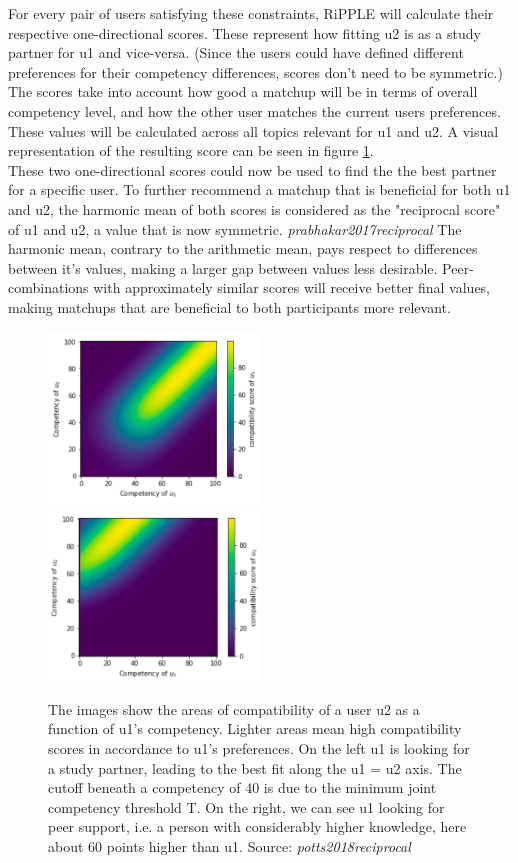 \documentclass[nochapterpage,bigchapter,linedtoc,longdoc,colorback,accentcolor=tud3b,oneside]{tudreport}
\begin{document}
For every pair of users satisfying these constraints, RiPPLE will calculate their respective one-directional scores. These represent how fitting u2 is as a study partner for u1 and vice-versa. (Since the users could have defined different preferences for their competency differences, scores don't need to be symmetric.) The scores take into account how good a matchup will be in terms of overall competency level, and how the other user matches the current users preferences. These values will be calculated across all topics relevant for u1 and u2. A visual representation of the resulting score can be seen in figure \ref{f:Seeking}.\\
These two one-directional scores could now be used to find the the best partner for a specific user. To further recommend a matchup that is beneficial for both u1 and u2, the harmonic mean of both scores is considered as the "reciprocal score" of u1 and u2, a value that is now symmetric. \textit{prabhakar2017reciprocal} The harmonic mean, contrary to the arithmetic mean, pays respect to differences between it's values, making a larger gap between values less desirable. Peer-combinations with approximately similar scores will receive better final values, making matchups that are beneficial to both participants more relevant.\\
\begin{figure}[h]
	\includegraphics[width=0.5\textwidth]{g/SeekingPartnerCompatibility.PNG}
	\includegraphics[width=0.5\textwidth]{g/SeekingSupportCompatibility.PNG}
	\caption{The images show the areas of compatibility of a user u2 as a function of u1's competency. Lighter areas mean high compatibility scores in accordance to u1's preferences. On the left u1 is looking for a study partner, leading to the best fit along the u1 = u2 axis. The cutoff beneath a competency of 40 is due to the minimum joint competency threshold T. On the right, we can see u1 looking for peer support, i.e. a person with considerably higher knowledge, here about 60 points higher than u1. Source: \textit{potts2018reciprocal}}
	\label{f:Seeking}
\end{figure}
\end{document}
